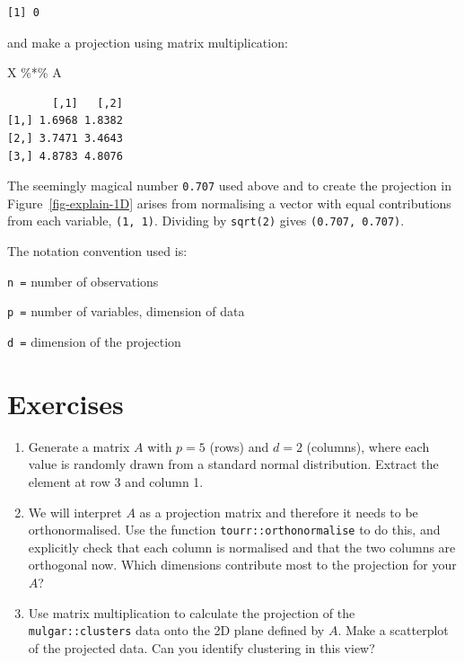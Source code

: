 \documentclass[
  letterpaper,
]{book}
\newenvironment{Shaded}{\begin{snugshade}}{\end{snugshade}}
\newcommand{\NormalTok}[1]{\textcolor[rgb]{0.00,0.23,0.31}{#1}}
\newcommand{\SpecialCharTok}[1]{\textcolor[rgb]{0.37,0.37,0.37}{#1}}
\providecommand{\tightlist}{%
  \setlength{\itemsep}{0pt}\setlength{\parskip}{0pt}}\usepackage{longtable,booktabs,array}
\begin{document}
\begin{verbatim}
[1] 0
\end{verbatim}

and make a projection using matrix multiplication:

\begin{Shaded}
\begin{Highlighting}[]
\NormalTok{X }\SpecialCharTok{\%*\%}\NormalTok{ A}
\end{Highlighting}
\end{Shaded}

\begin{verbatim}
       [,1]   [,2]
[1,] 1.6968 1.8382
[2,] 3.7471 3.4643
[3,] 4.8783 4.8076
\end{verbatim}

The seemingly magical number \texttt{0.707} used above and to create the
projection in Figure~\ref{fig-explain-1D} arises from normalising a
vector with equal contributions from each variable, \texttt{(1,\ 1)}.
Dividing by \texttt{sqrt(2)} gives \texttt{(0.707,\ 0.707)}.

The notation convention used is:

\texttt{n\ =} number of observations

\texttt{p\ =} number of variables, dimension of data

\texttt{d\ =} dimension of the projection

\hypertarget{exercises-1}{%
\section*{Exercises}\label{exercises-1}}


\begin{enumerate}
\def\labelenumi{\arabic{enumi}.}
\tightlist
\item
  Generate a matrix \(A\) with \(p=5\) (rows) and \(d=2\) (columns),
  where each value is randomly drawn from a standard normal
  distribution. Extract the element at row 3 and column 1.
\item
  We will interpret \(A\) as a projection matrix and therefore it needs
  to be orthonormalised. Use the function \texttt{tourr::orthonormalise}
  to do this, and explicitly check that each column is normalised and
  that the two columns are orthogonal now. Which dimensions contribute
  most to the projection for your \(A\)?
\item
  Use matrix multiplication to calculate the projection of the
  \texttt{mulgar::clusters} data onto the 2D plane defined by \(A\).
  Make a scatterplot of the projected data. Can you identify clustering
  in this view?
\end{enumerate}
\end{document}
